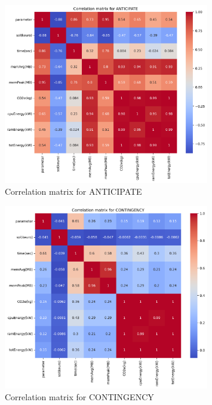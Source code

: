 \documentclass[a4paper,singleside,12pt]{report} %
\begin{document}
\begin{figure}[h!]
    \centering
    \includegraphics[width=0.8\textwidth]{imgs/ant_corr_mat.png}
    \caption{Correlation matrix for ANTICIPATE}
    \label{fig:ant_corr_mat}
\end{figure}

\begin{figure}[h!]
    \centering
    \includegraphics[width=0.8\textwidth]{imgs/cont_corr_mat.png}
    \caption{Correlation matrix for CONTINGENCY}
    \label{fig:ant_corr_mat}
\end{figure}
\end{document}
